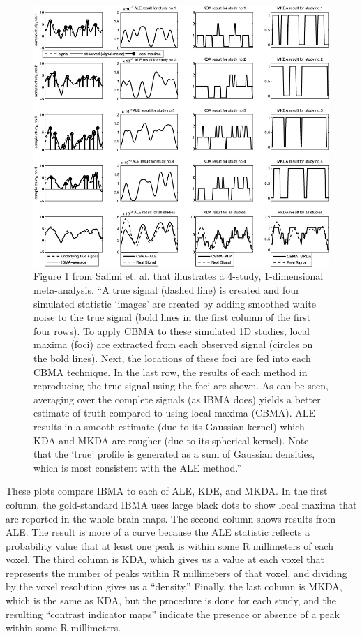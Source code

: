 \documentclass{report}
\begin{document}
\begin{figure}[h!]
\begin{center}
\includegraphics[width=15cm]{images/figure12.jpg}
\end{center}
 \caption{\label{fig:12} Figure 1 from Salimi et. al. that illustrates a 4-study,
1-dimensional meta-analysis. ``A true signal (dashed line) is created
and four simulated statistic `images' are created by adding smoothed
white noise to the true signal (bold lines in the first column of the
first four rows). To apply CBMA to these simulated 1D studies, local
maxima (foci) are extracted from each observed signal (circles on the
bold lines). Next, the locations of these foci are fed into each CBMA
technique. In the last row, the results of each method in reproducing
the true signal using the foci are shown. As can be seen, averaging over
the complete signals (as IBMA does) yields a better estimate of truth
compared to using local maxima (CBMA). ALE results in a smooth estimate
(due to its Gaussian kernel) which KDA and MKDA are rougher (due to its
spherical kernel). Note that the `true' profile is generated as a sum of
Gaussian densities, which is most consistent with the ALE method.''}
\end{figure}

These plots \cite{Salimi-Khorshidi2009-if} compare
IBMA to each of ALE, KDE, and MKDA. In the first column, the
gold-standard IBMA uses large black dots to show local maxima that are
reported in the whole-brain maps. The second column shows results from
ALE. The result is more of a curve because the ALE statistic reflects a
probability value that at least one peak is within some R millimeters of
each voxel. The third column is KDA, which gives us a value at each
voxel that represents the number of peaks within R millimeters of that
voxel, and dividing by the voxel resolution gives us a ``density.''
Finally, the last column is MKDA, which is the same as KDA, but the
procedure is done for each study, and the resulting ``contrast indicator
maps'' indicate the presence or absence of a peak within some R
millimeters.
\end{document}
